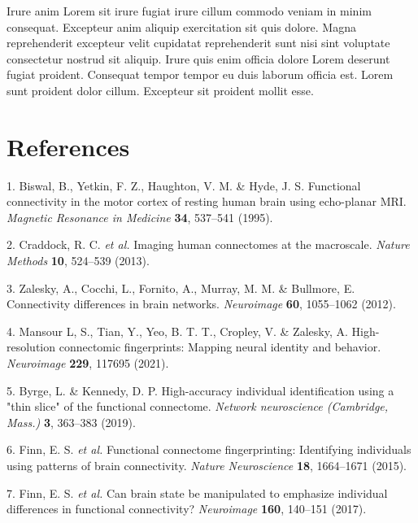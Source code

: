 Irure anim Lorem sit irure fugiat irure cillum commodo veniam in minim
consequat. Excepteur anim aliquip exercitation sit quis dolore. Magna
reprehenderit excepteur velit cupidatat reprehenderit sunt nisi sint
voluptate consectetur nostrud sit aliquip. Irure quis enim officia
dolore Lorem deserunt fugiat proident. Consequat tempor tempor eu duis
laborum officia est. Lorem sunt proident dolor cillum. Excepteur sit
proident mollit esse.

\pagebreak

\hypertarget{references}{%
\section{References}\label{references}}

\setlength{\parskip}{0.05cm plus4mm minus3mm}
\begin{hangparas}{1em}{1}

\hypertarget{refs}{}
\leavevmode\hypertarget{ref-biswal_1995}{}%
1. Biswal, B., Yetkin, F. Z., Haughton, V. M. \& Hyde, J. S. Functional
connectivity in the motor cortex of resting human brain using
echo-planar MRI. \emph{Magnetic Resonance in Medicine} \textbf{34},
537--541 (1995).

\leavevmode\hypertarget{ref-craddock_2013}{}%
2. Craddock, R. C. \emph{et al.} Imaging human connectomes at the
macroscale. \emph{Nature Methods} \textbf{10}, 524--539 (2013).

\leavevmode\hypertarget{ref-zalesky_2012}{}%
3. Zalesky, A., Cocchi, L., Fornito, A., Murray, M. M. \& Bullmore, E.
Connectivity differences in brain networks. \emph{Neuroimage}
\textbf{60}, 1055--1062 (2012).

\leavevmode\hypertarget{ref-mansourl_2021}{}%
4. Mansour L, S., Tian, Y., Yeo, B. T. T., Cropley, V. \& Zalesky, A.
High-resolution connectomic fingerprints: Mapping neural identity and
behavior. \emph{Neuroimage} \textbf{229}, 117695 (2021).

\leavevmode\hypertarget{ref-byrge_2019}{}%
5. Byrge, L. \& Kennedy, D. P. High-accuracy individual identification
using a "thin slice" of the functional connectome. \emph{Network
neuroscience (Cambridge, Mass.)} \textbf{3}, 363--383 (2019).

\leavevmode\hypertarget{ref-finn_2015}{}%
6. Finn, E. S. \emph{et al.} Functional connectome fingerprinting:
Identifying individuals using patterns of brain connectivity.
\emph{Nature Neuroscience} \textbf{18}, 1664--1671 (2015).

\leavevmode\hypertarget{ref-finn_2017}{}%
7. Finn, E. S. \emph{et al.} Can brain state be manipulated to emphasize
individual differences in functional connectivity? \emph{Neuroimage}
\textbf{160}, 140--151 (2017).


\end{hangparas}
